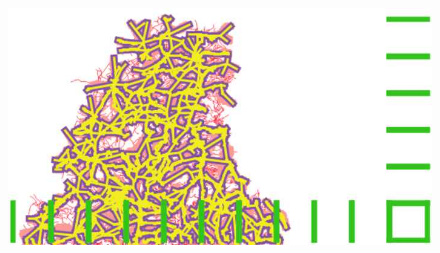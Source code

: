 

\begin{figure}
	\includegraphics[width=\textheight,angle=90]{Figures/Final/CL-artwork.jpg}
\end{figure}











